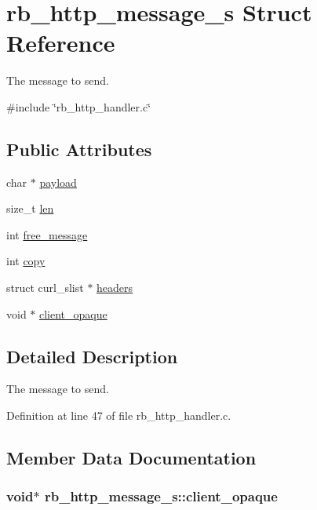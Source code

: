 \hypertarget{structrb__http__message__s}{\section{rb\-\_\-http\-\_\-message\-\_\-s Struct Reference}
\label{structrb__http__message__s}
}


The message to send.  




{\ttfamily \#include \char`\"{}rb\-\_\-http\-\_\-handler.\-c\char`\"{}}

\subsection*{Public Attributes}
\begin{DoxyCompactItemize}
\item 
char $\ast$ \hyperlink{structrb__http__message__s_a70cd28f794d09eb47cf19a37fb7ba42b}{payload}
\item 
size\-\_\-t \hyperlink{structrb__http__message__s_a8c352ee939f1cd197bf009583e61552f}{len}
\item 
int \hyperlink{structrb__http__message__s_acbfdd79b7ec041a7b7e0edac1da72d30}{free\-\_\-message}
\item 
int \hyperlink{structrb__http__message__s_aceda798a9af4f28a6dc89b273e6c348a}{copy}
\item 
struct curl\-\_\-slist $\ast$ \hyperlink{structrb__http__message__s_ae12176a1bd60ed536eda95e2c530acc4}{headers}
\item 
void $\ast$ \hyperlink{structrb__http__message__s_aa25eb69a09434b70882260a326dd704c}{client\-\_\-opaque}
\end{DoxyCompactItemize}


\subsection{Detailed Description}
The message to send. 

Definition at line 47 of file rb\-\_\-http\-\_\-handler.\-c.



\subsection{Member Data Documentation}
\hypertarget{structrb__http__message__s_aa25eb69a09434b70882260a326dd704c}{
\subsubsection[{client\-\_\-opaque}]{\setlength{\rightskip}{0pt plus 5cm}void$\ast$ rb\-\_\-http\-\_\-message\-\_\-s\-::client\-\_\-opaque}}\label{structrb__http__message__s_aa25eb69a09434b70882260a326dd704c}


